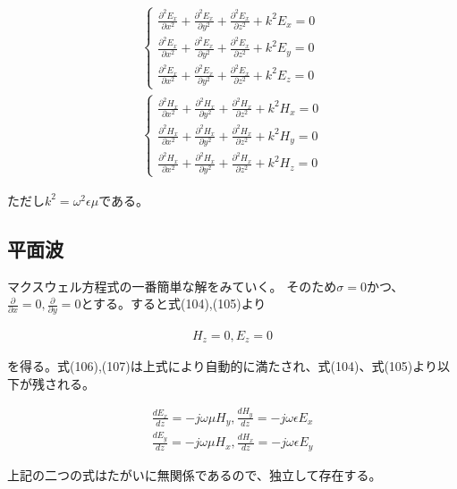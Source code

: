\documentclass[7pt,uplatex,dvipdfmx,twocolumn]{jsarticle}
\begin{document}
\begin{align}
\begin{cases}
\frac{\partial ^2E_x}{\partial x^2}+\frac{\partial ^2E_x}{\partial y^2}+\frac{\partial ^2E_x}{\partial z^2}+k^2E_x=0 \\
\frac{\partial ^2E_x}{\partial x^2}+\frac{\partial ^2E_x}{\partial y^2}+\frac{\partial ^2E_x}{\partial z^2}+k^2E_y=0 \\
\frac{\partial ^2E_x}{\partial x^2}+\frac{\partial ^2E_x}{\partial y^2}+\frac{\partial ^2E_x}{\partial z^2}+k^2E_z=0 
\end{cases}\\
\begin{cases}
  \frac{\partial ^2H_x}{\partial x^2}+\frac{\partial ^2H_x}{\partial y^2}+\frac{\partial ^2H_x}{\partial z^2}+k^2H_x=0 \\
  \frac{\partial ^2H_x}{\partial x^2}+\frac{\partial ^2H_x}{\partial y^2}+\frac{\partial ^2H_x}{\partial z^2}+k^2H_y=0 \\
  \frac{\partial ^2H_x}{\partial x^2}+\frac{\partial ^2H_x}{\partial y^2}+\frac{\partial ^2H_x}{\partial z^2}+k^2H_z=0 
  \end{cases}
\end{align}

ただし$k^2=\omega^2\epsilon\mu$である。

\subsection{平面波}

マクスウェル方程式の一番簡単な解をみていく。
そのため$\sigma=0$かつ、$\frac{\partial }{\partial x}=0,\frac{\partial}{\partial y}=0$とする。すると式(104),(105)より

\begin{align}
H_z=0,E_z=0
\end{align}

を得る。式(106),(107)は上式により自動的に満たされ、式(104)、式(105)より以下が残される。

\begin{align}
\frac{dE_x}{dz}=-j\omega\mu H_y,\frac{dH_y}{dz}=-j\omega\epsilon E_x\\
\frac{dE_y}{dz}=-j\omega\mu H_x,\frac{dH_x}{dz}=-j\omega\epsilon E_y
\end{align}

上記の二つの式はたがいに無関係であるので、独立して存在する。
\end{document}
